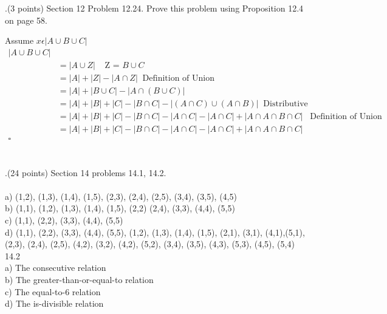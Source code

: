 \documentclass[12pt]{article}
\begin{document}
.(3 points)  Section 12 Problem 12.24.  Prove this problem using Proposition 12.4 on page 58.  
\vspace{.15in}

\item Assume $x \epsilon |A \cup B \cup C|$ \\ 
\[
\begin{aligned} 
 |A \cup B \cup C|\\
&= |A \cup Z|  \;\;\;\;  \mbox{Z = $B \cup C$} \\   
&= |A| + |Z| - |A \cap Z|  \;\; \mbox{Definition of Union}\\
&= |A| + |B \cup C| - |A \cap (B \cup C)| \;\; \mbox{}\\
&= |A| + |B| + |C| - |B \cap C| - |(A \cap C) \cup (A \cap B)| \;\; \mbox{Distributive} \\
&= |A| + |B| + |C| - |B \cap C| - |A \cap C| - |A \cap C| + |A \cap A \cap B \cap C| \;\;\; \mbox{Definition of Union} \\
&= |A| + |B| + |C| - |B \cap C| - |A \cap C| - |A \cap C| + |A \cap A \cap B \cap C| \\ 
\square \\
\end{aligned}
\]



\\
.(24 points)  Section 14 problems 14.1, 14.2. \\
  \\
\indent a) (1,2), (1,3), (1,4), (1,5), (2,3), (2,4), (2,5), (3,4), (3,5), (4,5) \\
\indent b) (1,1), (1,2), (1,3), (1,4), (1,5), (2,2) (2,4), (3,3), (4,4), (5,5) \\
\indent c) (1,1), (2,2), (3,3), (4,4), (5,5) \\
\indent d) (1,1), (2,2), (3,3), (4,4), (5,5), (1,2), (1,3), (1,4), (1,5), (2,1), (3,1), (4,1),(5,1), (2,3), (2,4), (2,5), (4,2), (3,2), (4,2), (5,2), (3,4), (3,5), (4,3), (5,3), (4,5), (5,4)\\

14.2 \\
\indetn a) The consecutive relation \\
\indent b) The greater-than-or-equal-to relation \\
\indent c) The equal-to-6 relation \\
\indent d) The is-divisible relation\\

\vspace{.15in}
\end{document}
